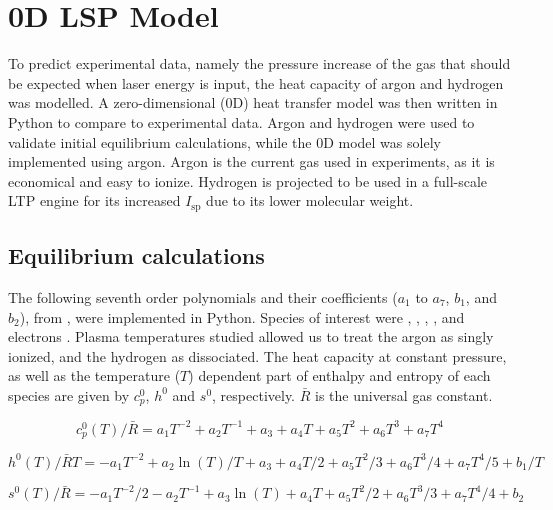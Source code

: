 \chapter{0D LSP Model} \label{chp:models}

    To predict experimental data, namely the pressure increase of the gas that should be expected when laser energy is input, the heat capacity of argon and hydrogen was modelled. A zero-dimensional (0D) heat transfer model was then written in Python to compare to experimental data. Argon and hydrogen were used to validate initial equilibrium calculations, while the 0D model was solely implemented using argon. Argon is the current gas used in experiments, as it is economical and easy to ionize. Hydrogen is projected to be used in a full-scale LTP engine for its increased $I_\mathrm{sp}$ due to its lower molecular weight.

    \section{Equilibrium calculations} \label{sec:equilibrium calcs}
        
        The following seventh order polynomials and their coefficients ($a_1$ to $a_7$, $b_1$, and $b_2$), from \textcite{mcbrideNASAGlennCoefficients2002}, were implemented in Python. Species of interest were , , , , and electrons . Plasma temperatures studied allowed us to treat the argon as singly ionized, and the hydrogen as dissociated. The heat capacity at constant pressure, as well as the temperature ($T$) dependent part of enthalpy and entropy of each species are given by $c_p^0$, $h^0$ and $s^0$, respectively. $\bar R$ is the universal gas constant.

        \begin{equation}
            c_p^0 (T)/\bar R = a_1 T^{-2} + a_2 T^{-1} + a_3 + a_4   T + a_5 T^2 + a_6 T^3 + a_7 T^4
        \end{equation} 
        
        \begin{equation}
            h^0 (T)/\bar RT = -a_1 T^{-2} + a_2 \ln(T)/T + a_3 + a_4 T / 2 + a_5 {T^2}/3 + a_6 {T^3}/4 + a_7 {T^4}/5 + b_1/T
        \end{equation}
        
        \begin{equation}
            s^0(T)/\bar R = -a_1 T^{-2}/2 - a_2 T^{-1} + a_3\ln(T) + a_4   T + a_5 {T^2}/2 + a_6 T^3/3 + a_7 T^4/4 + b_2
        \end{equation}

